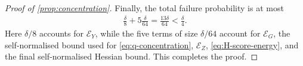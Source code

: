 \documentclass[11pt]{article}
\newcommand{\1}{\mathbf 1}
\begin{document}
\begin{proof}[Proof of \cref{prop:concentration}]
    Finally, the total failure probability is at most
    \begin{align}
        \frac{\delta}{8}
        +
        5\frac{\delta}{64}
        =
        \frac{13\delta}{64}
        <
        \frac{\delta}{4}.
    \end{align}
    Here $\delta/8$ accounts for $\mathcal E_Y$, while the five terms
    of size $\delta/64$ account for $\mathcal E_G$, the
    self-normalised bound used for \eqref{eq:q-concentration},
    $\mathcal E_Z$, \eqref{eq:H-score-energy}, and the final
    self-normalised Hessian bound. This completes the proof.
\end{proof}






\end{document}
